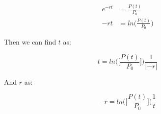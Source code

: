 \documentclass[12pt, UTF8]{article}
\begin{document}
	\begin{align}
		e^{-rt} &= \frac{P(t)}{P_{0}}  \nonumber \\
		-rt &= ln\big(\frac{P(t)}{P_{0}}\big)  \nonumber
	\end{align}

	Then we can find $t$ as:

	\begin{equation}
		t = ln\big(\big[\frac{P(t)}{P_{0}}\big]\big) \frac{1}{|-r|}
	\end{equation}

	And $r$ as:

	\begin{equation}
		-r = ln\big(\big[\frac{P(t)}{P_{0}}\big]\big) \frac{1}{t}
	\end{equation}
\end{document}
